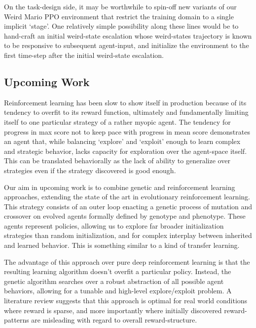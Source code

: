 \documentclass[]{article}
\begin{document}
On the task-design side, it may be worthwhile to spin-off new variants
of our Weird Mario PPO environment that restrict the training domain to
a single implicit `stage'. One relatively simple possibility along these
lines would be to hand-craft an initial weird-state escalation whose
weird-states trajectory is known to be responsive to subsequent
agent-input, and initialize the environment to the first time-step after
the initial weird-state escalation.

\hypertarget{upcoming-work}{%
\subsection{Upcoming Work}\label{upcoming-work}}

Reinforcement learning has been slow to show itself in production
because of its tendency to overfit to its reward function, ultimately
and fundamentally limiting itself to one particular strategy of a rather
myopic agent. The tendency for progress in max score not to keep pace
with progress in mean score demonstrates an agent that, while balancing
`explore' and `exploit' enough to learn complex and strategic behavior,
lacks capacity for exploration over the agent-space itself. This can be
translated behaviorally as the lack of ability to generalize over
strategies even if the strategy discovered is good enough.

Our aim in upcoming work is to combine genetic and reinforcement
learning approaches, extending the state of the art in evolutionary
reinforcement learning. This strategy consists of an outer loop enacting
a genetic process of mutation and crossover on evolved agents formally
defined by genotype and phenotype. These agents represent policies,
allowing us to explore far broader initialization strategies than random
initialization, and for complex interplay between inherited and learned
behavior. This is something similar to a kind of transfer learning.

The advantage of this approach over pure deep reinforcement learning is
that the resulting learning algorithm doesn't overfit a particular
policy. Instead, the genetic algorithm searches over a robust
abstraction of all possible agent behaviors, allowing for a tunable and
high-level explore/exploit problem. A literature review suggests that
this approach is optimal for real world conditions where reward is
sparse, and more importantly where initially discovered reward-patterns
are misleading with regard to overall reward-structure.
\end{document}
